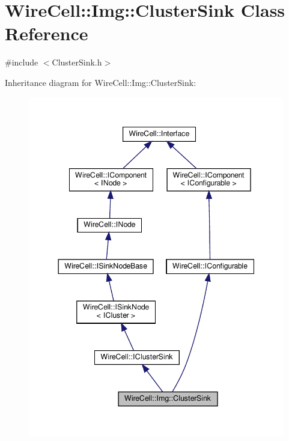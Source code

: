 \hypertarget{class_wire_cell_1_1_img_1_1_cluster_sink}{}\section{Wire\+Cell\+:\+:Img\+:\+:Cluster\+Sink Class Reference}
\label{class_wire_cell_1_1_img_1_1_cluster_sink}


{\ttfamily \#include $<$Cluster\+Sink.\+h$>$}



Inheritance diagram for Wire\+Cell\+:\+:Img\+:\+:Cluster\+Sink\+:
\nopagebreak
\begin{figure}[H]
\begin{center}
\leavevmode
\includegraphics[width=344pt]{class_wire_cell_1_1_img_1_1_cluster_sink__inherit__graph}
\end{center}
\end{figure}


